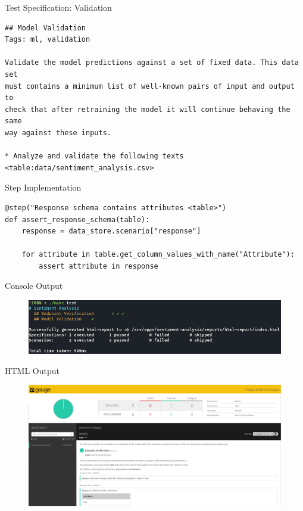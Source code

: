 \begin{frame}[fragile]{Test Specification: Validation}
    \footnotesize{
        \begin{verbatim}
## Model Validation
Tags: ml, validation

Validate the model predictions against a set of fixed data. This data set
must contains a minimum list of well-known pairs of input and output to
check that after retraining the model it will continue behaving the same
way against these inputs.

* Analyze and validate the following texts <table:data/sentiment_analysis.csv>
        \end{verbatim}
    }
\end{frame}

\begin{frame}[fragile]{Step Implementation}
    \begin{verbatim}
@step("Response schema contains attributes <table>")
def assert_response_schema(table):
    response = data_store.scenario["response"]

    for attribute in table.get_column_values_with_name("Attribute"):
        assert attribute in response
    \end{verbatim}
\end{frame}

\begin{frame}{Console Output}
    \begin{figure}
        \includegraphics[width=\textwidth]{img/test-console-output.png}
    \end{figure}
\end{frame}

\begin{frame}{HTML Output}
    \begin{figure}
        \includegraphics[width=\textwidth]{img/test-html-output.png}
    \end{figure}
\end{frame}
